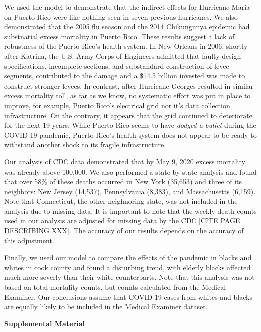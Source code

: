 \documentclass[11pt]{article}
\begin{document}
We used the model to demonstrate that the indirect effects for Hurricane María on Puerto Rico were like nothing seen in seven previous hurricanes. We also demonstrated that the 2005 flu season and the 2014 Chikungunya epidemic had substnatial excess mortality in Puerto Rico. These results suggest a lack of robustness of the Puerto Rico's health system. In New Orleans in 2006, shortly after Katrina,
the U.S. Army Corps of Engineers admitted that faulty design specifications, incomplete sections,
and substandard construction of levee segments, contributed to the damage and a \$14.5 billion invested was made to construct stronger levees. In contrast, after Hurricane Georges resulted in similar excess mortality toll, as far as we know, no systematic effort was put in place to improve, for example, Puerto Rico’s electrical grid nor it's data collection infrastructure. On the contrary, it appears that the grid continued to deteriorate for the next 19 years. While Puerto Rico seems to have \emph{dodged a bullet} during the COVID-19 pandemic, Puerto Rico’s health system does not appear to be ready to withstand another shock to its fragile infrastructure.

Our analysis of CDC data demonstrated that by May 9, 2020 excess mortality was already above 100,000. We also performed a state-by-state analysis and found that over 58\% of these deaths occurred in New York (35,653) and three of its neighbors: New Jersey (14,537), Pennsylvania (8,383), and Massachusetts (6,159). Note that Connecticut, the other neighnoring state, was not included in the analysis due to missing data. It is important to note that the weekly death counts used in our analysis are adjusted for missing data by the CDC [CITE PAGE DESCRIBING XXX]. The accuracy of our results depends on the accuracy of this adjustment. 

Finally, we used our model to compare the effects of the pandemic in blacks and whites in cook county and found a disturbing trend, with elderly blacks affected much more severly than their white counterparts. Note that this analysis was not based on total mortality counts, but counts calculated from the Medical Examiner. Our conclusions assume that COVID-19 cases from whites and blacks are equally likely to be included in the Medical Examiner dataset. 




\newpage
\begin{center}
\LARGE{\textbf{Supplemental Material}}
\end{center}
\end{document}
